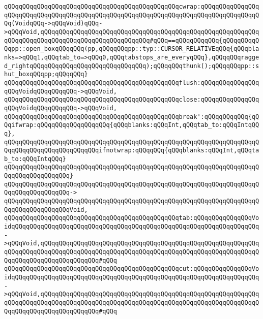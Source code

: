 \verb|qQQqqQQqqQQqqQQqqQQqqQQqqQQqqQQqqQQqqQQqqQQqqQQqcwrap:qQQqqQQqqQQqqQQqqQQqqQQqqQQqqQQqqQQqqQQqqQQqqQQqqQQqqQQqqQQqqQQqqQQqqQQqqQQqqQQqqQQqqQQq(VoidqQQq->qQQqVoid)qQQq->qQQqVoid,qQQqqQQqqQQqqQQqqQQqqQQqqQQqqQQqqQQqqQQqqQQqqQQqqQQqqQQqqQQqqQQqqQQqqQQqqQQqqQQqqQQqqQQqqQQqqQQqqQQq#qQQq==qQQqqQQqqQQq{qQQqqQQqqQQqpp::open_boxqQQqqQQq(pp,qQQqqQQqpp::typ::CURSOR_RELATIVEqQQq{qQQqblanks=>qQQq1,qQQqtab_to=>qQQq0,qQQqtabstops_are_everyqQQq},qQQqqQQqragged_rightqQQqqQQqqQQqqQQqqQQqqQQqqQQqqQQq);qQQqqQQqthunk();qQQqqQQqpp::shut_boxqQQqpp;qQQqqQQq}|\newline
\newline
\verb|qQQqqQQqqQQqqQQqqQQqqQQqqQQqqQQqqQQqqQQqqQQqqQQqflush:qQQqqQQqqQQqqQQqqQQqVoidqQQqqQQqqQQq->qQQqVoid,|\newline
\verb|qQQqqQQqqQQqqQQqqQQqqQQqqQQqqQQqqQQqqQQqqQQqqQQqclose:qQQqqQQqqQQqqQQqqQQqVoidqQQqqQQqqQQq->qQQqVoid,|\newline
\newline
\verb|qQQqqQQqqQQqqQQqqQQqqQQqqQQqqQQqqQQqqQQqqQQqqQQqbreak':qQQqqQQqqQQq{qQQqifwrap:qQQqqQQqqQQqqQQqqQQq{qQQqblanks:qQQqInt,qQQqtab_to:qQQqIntqQQq},|\newline
\verb|qQQqqQQqqQQqqQQqqQQqqQQqqQQqqQQqqQQqqQQqqQQqqQQqqQQqqQQqqQQqqQQqqQQqqQQqqQQqqQQqqQQqqQQqqQQqqQQqifnotwrap:qQQqqQQq{qQQqblanks:qQQqInt,qQQqtab_to:qQQqIntqQQq}|\newline
\verb|qQQqqQQqqQQqqQQqqQQqqQQqqQQqqQQqqQQqqQQqqQQqqQQqqQQqqQQqqQQqqQQqqQQqqQQqqQQqqQQqqQQqqQQq}|\newline
\verb|qQQqqQQqqQQqqQQqqQQqqQQqqQQqqQQqqQQqqQQqqQQqqQQqqQQqqQQqqQQqqQQqqQQqqQQqqQQqqQQqqQQqqQQq->|\newline
\verb|qQQqqQQqqQQqqQQqqQQqqQQqqQQqqQQqqQQqqQQqqQQqqQQqqQQqqQQqqQQqqQQqqQQqqQQqqQQqqQQqqQQqqQQqVoid,|\newline
\newline
\verb|qQQqqQQqqQQqqQQqqQQqqQQqqQQqqQQqqQQqqQQqqQQqqQQqtab:qQQqqQQqqQQqqQQqVoidqQQqqQQqqQQqqQQqqQQqqQQqqQQqqQQqqQQqqQQqqQQqqQQqqQQqqQQqqQQqqQQqqQQq->qQQqVoid,qQQqqQQqqQQqqQQqqQQqqQQqqQQqqQQqqQQqqQQqqQQqqQQqqQQqqQQqqQQqqQQqqQQqqQQqqQQqqQQqqQQqqQQqqQQqqQQqqQQqqQQqqQQqqQQqqQQqqQQqqQQqqQQqqQQqqQQqqQQqqQQqqQQqqQQqqQQq#qQQq|\newline
\verb|qQQqqQQqqQQqqQQqqQQqqQQqqQQqqQQqqQQqqQQqqQQqqQQqcut:qQQqqQQqqQQqqQQqVoidqQQqqQQqqQQqqQQqqQQqqQQqqQQqqQQqqQQqqQQqqQQqqQQqqQQqqQQqqQQqqQQqqQQq->qQQqVoid,qQQqqQQqqQQqqQQqqQQqqQQqqQQqqQQqqQQqqQQqqQQqqQQqqQQqqQQqqQQqqQQqqQQqqQQqqQQqqQQqqQQqqQQqqQQqqQQqqQQqqQQqqQQqqQQqqQQqqQQqqQQqqQQqqQQqqQQqqQQqqQQqqQQqqQQqqQQq#qQQq|\newline

